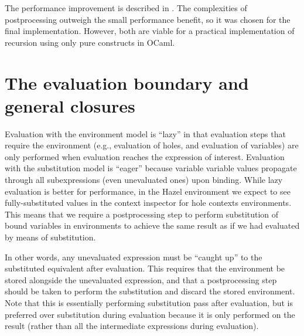 The performance improvement is described in . The complexities of postprocessing outweigh the small performance benefit, so it was chosen for the final implementation. However, both are viable for a practical implementation of recursion using only pure constructs in OCaml.


\section{The evaluation boundary and general closures}
\label{sec:generalized-closures-eval-boundary}

Evaluation with the environment model is ``lazy'' in that evaluation steps that require the environment (e.g., evaluation of holes, and evaluation of variables) are only performed when evaluation reaches the expression of interest. Evaluation with the substitution model is ``eager'' because variable variable values propagate through all subexpressions (even unevaluated ones) upon binding. While lazy evaluation is better for performance, in the Hazel environment we expect to see fully-substituted values in the context inspector for hole contexts environments. This means that we require a postprocessing step to perform substitution of bound variables in environments to achieve the same result as if we had evaluated by means of substitution.

In other words, any unevaluated expression must be ``caught up'' to the substituted equivalent after evaluation. This requires that the environment be stored alongside the unevaluated expression, and that a postprocessing step should be taken to perform the substitution and discard the stored environment. Note that this is essentially performing substitution pass after evaluation, but is preferred over substitution during evaluation because it is only performed on the result (rather than all the intermediate expressions during evaluation).

